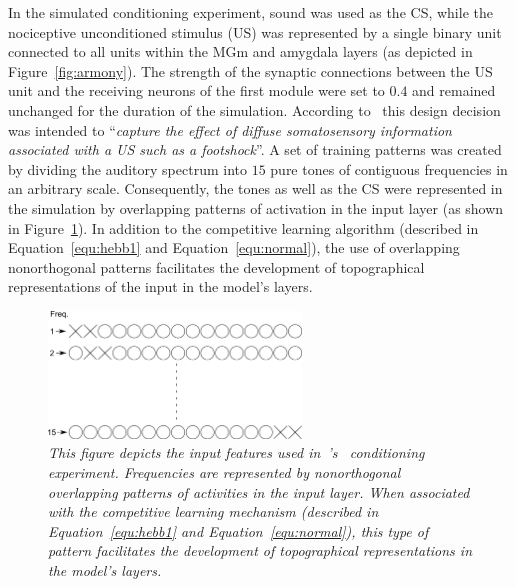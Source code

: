 In the simulated conditioning experiment, sound was used as the CS, while the nociceptive unconditioned stimulus (US) was represented by a single binary unit connected to all units within the MGm and amygdala layers (as depicted in Figure~\ref{fig:armony}). The strength of the synaptic connections between the US unit and the receiving neurons of the first module were set to $0.4$ and remained unchanged for the duration of the simulation. According to~\citet{Armony1995} this design decision was intended to ``\emph{capture the effect of diffuse somatosensory information associated with a US such as a footshock}''. A set of training patterns was created by dividing the auditory spectrum into $15$ pure tones of contiguous frequencies in an arbitrary scale. Consequently, the tones as well as the CS were represented in the simulation by overlapping patterns of activation in the input layer (as shown in Figure~\ref{fig:armony_input_feats}). In addition to the competitive learning algorithm (described in Equation~\ref{equ:hebb1} and Equation~\ref{equ:normal}), the use of overlapping nonorthogonal patterns facilitates the development of topographical representations of the input in the model's layers.\\

\begin{figure}[!htbp]
   \begin{center}
      \includegraphics[width=0.6\textwidth]{Figs/input_features}
      \caption{\textit{This figure depicts the input features used in~\citeauthor{Armony1995}'s~\citeyearpar{Armony1995} conditioning experiment. Frequencies are represented by nonorthogonal overlapping patterns of activities in the input layer. When associated with the competitive learning mechanism (described in Equation~\ref{equ:hebb1} and Equation~\ref{equ:normal}), this type of pattern facilitates the development of topographical representations in the model's layers.}}\label{fig:armony_input_feats}
   \end{center}
\end{figure}

